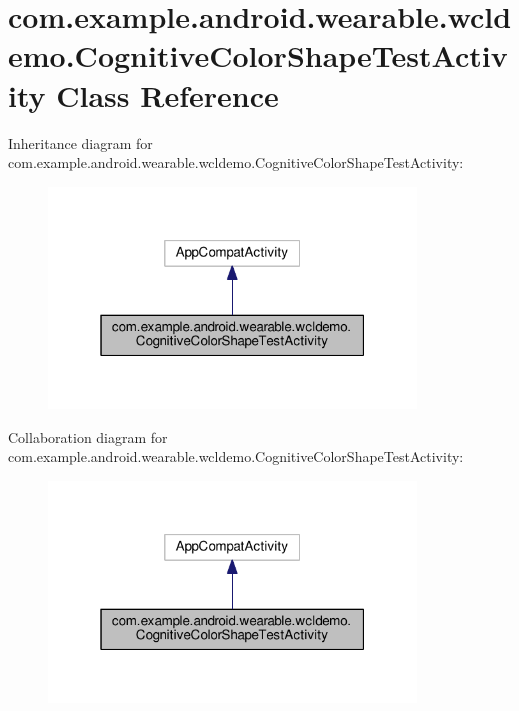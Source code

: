 \hypertarget{classcom_1_1example_1_1android_1_1wearable_1_1wcldemo_1_1CognitiveColorShapeTestActivity}{}\section{com.\+example.\+android.\+wearable.\+wcldemo.\+Cognitive\+Color\+Shape\+Test\+Activity Class Reference}
\label{classcom_1_1example_1_1android_1_1wearable_1_1wcldemo_1_1CognitiveColorShapeTestActivity}


Inheritance diagram for com.\+example.\+android.\+wearable.\+wcldemo.\+Cognitive\+Color\+Shape\+Test\+Activity\+:\nopagebreak
\begin{figure}[H]
\begin{center}
\leavevmode
\includegraphics[width=277pt]{d5/d65/classcom_1_1example_1_1android_1_1wearable_1_1wcldemo_1_1CognitiveColorShapeTestActivity__inherit__graph}
\end{center}
\end{figure}


Collaboration diagram for com.\+example.\+android.\+wearable.\+wcldemo.\+Cognitive\+Color\+Shape\+Test\+Activity\+:\nopagebreak
\begin{figure}[H]
\begin{center}
\leavevmode
\includegraphics[width=277pt]{d8/d9b/classcom_1_1example_1_1android_1_1wearable_1_1wcldemo_1_1CognitiveColorShapeTestActivity__coll__graph}
\end{center}
\end{figure}
